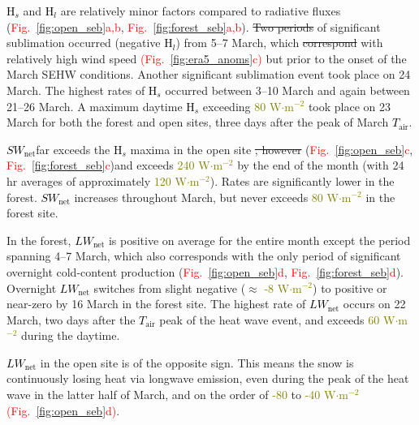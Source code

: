 \documentclass[draft]{agujournal2019}
\newcommand{\fig}[2]{\textcolor{red}{(Fig.~\ref{#1}{#2})}}   %
\newcommand{\fignop}[2]{\textcolor{red}{Fig.~\ref{#1}{#2}}}  %
\newcommand{\mynum}[1]{\textcolor{olive}{#1}}
\newcommand{\tair}{\textcolor{black}{$T_{\mathrm{air}}$}\xspace}
\newcommand{\lwnet}{\textcolor{black}{$LW_{\mathrm{net}}$}\xspace}
\newcommand{\hs}{\textcolor{black}{H$_s$}\xspace}
\newcommand{\hlat}{\textcolor{black}{H$_l$}\xspace}
\newcommand{\swnet}{\textcolor{black}{$SW_{\mathrm{net}}$}\xspace}
\newcommand{\wmsq}{\textcolor{olive}{W$\cdot$m$^{-2}$}\xspace}
\providecommand{\DIFadd}[1]{{\protect\color{blue}\uwave{#1}}} %
\providecommand{\DIFdel}[1]{{\protect\color{red}\sout{#1}}}                      %
\providecommand{\DIFaddbegin}{} %
\providecommand{\DIFaddend}{} %
\providecommand{\DIFdelbegin}{} %
\providecommand{\DIFdelend}{} %
\begin{document}
\hs and \hlat are relatively minor factors compared to radiative fluxes (\fignop{fig:open_seb}{a,b}, \fignop{fig:forest_seb}{a,b}).
\DIFdelbegin \DIFdel{Two periods }\DIFdelend \DIFaddbegin \DIFadd{A period }\DIFaddend of significant sublimation occurred (negative \hlat) from 5--7 March, which \DIFdelbegin \DIFdel{correspond }\DIFdelend \DIFaddbegin \DIFadd{corresponds }\DIFaddend with relatively high wind speed \fig{fig:era5_anoms}{c} but prior to the onset of the March SEHW conditions.
Another significant sublimation event took place on 24 March.
The highest rates of \hs occurred between 3--10 March and again between 21--26 March.
A maximum daytime \hs exceeding \mynum{80} \wmsq took place on 23 March for both the forest and open sites, three days after the peak of March \tair.

\swnet\DIFaddbegin \DIFadd{, however, }\DIFaddend far exceeds the \hs maxima in the open site \DIFdelbegin \DIFdel{, however }\DIFdelend (\fignop{fig:open_seb}{c}, \fignop{fig:forest_seb}{c})\DIFaddbegin \DIFadd{, }\DIFaddend and exceeds \mynum{240} \wmsq by the end of the month (with 24 hr averages of approximately \mynum{120} \wmsq).
Rates are significantly lower in the forest.
\swnet increases throughout March, but never exceeds \mynum{80} \wmsq in the forest site.

In the forest, \lwnet is positive on average for the entire month except the period spanning 4--7 March, which also corresponds with the only period of significant overnight cold-content production (\fignop{fig:open_seb}{d}, \fignop{fig:forest_seb}{d}).
Overnight \lwnet switches from slight negative ($\approx$ \mynum{-8} \wmsq) to positive or near-zero by 16 March in the forest site.
The highest rate of \lwnet occurs on 22 March, two days after the \tair peak of the heat wave event, and exceeds \mynum{60} \wmsq during the daytime.

\lwnet in the open site is of the opposite sign. 
This means the snow is continuously losing heat via longwave emission, even during the peak of the heat wave in the latter half of March, and on the order of \mynum{-80} to \mynum{-40} \wmsq \fig{fig:open_seb}{d}.
\end{document}
